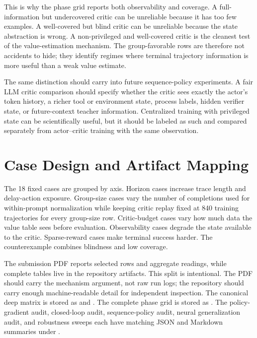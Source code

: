 \documentclass[11pt]{article}
\begin{document}
This is why the phase grid reports both observability and coverage. A
full-information but undercovered critic can be unreliable because it has too
few examples. A well-covered but blind critic can be unreliable because the
state abstraction is wrong. A non-privileged and well-covered critic is the
cleanest test of the value-estimation mechanism. The group-favorable rows are
therefore not accidents to hide; they identify regimes where terminal
trajectory information is more useful than a weak value estimate.

The same distinction should carry into future sequence-policy experiments. A
fair LLM critic comparison should specify whether the critic sees exactly the
actor's token history, a richer tool or environment state, process labels, hidden
verifier state, or future-context teacher information. Centralized training
with privileged state can be scientifically useful, but it should be labeled as
such and compared separately from actor--critic training with the same
observation.

\section{Case Design and Artifact Mapping}

The 18 fixed cases are grouped by axis. Horizon cases increase trace length and
delay-action exposure. Group-size cases vary the number of completions used for
within-prompt normalization while keeping critic replay fixed at 840 training
trajectories for every group-size row. Critic-budget cases vary how much data
the value table sees before evaluation. Observability cases degrade the state
available to the critic. Sparse-reward cases make terminal success harder. The
counterexample combines blindness and low coverage.

The submission PDF reports selected rows and aggregate readings, while complete
tables live in the repository artifacts. This split is intentional. The PDF
should carry the mechanism argument, not raw run logs; the repository should
carry enough machine-readable detail for independent inspection. The canonical
deep matrix is stored as  and
. The complete phase grid is stored as
. The policy-gradient audit,
closed-loop audit, sequence-policy audit, neural generalization audit, and
robustness sweeps each have matching JSON and Markdown summaries under
.
\end{document}
